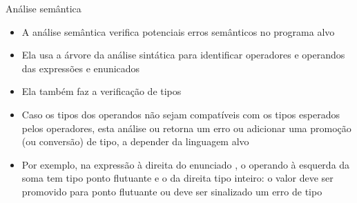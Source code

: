 \begin{frame}[fragile]{Análise semântica}

    \begin{itemize}
        \item A análise semântica verifica potenciais erros semânticos no programa alvo
        \pause

        \item Ela usa a árvore da análise sintática para identificar operadores e operandos das expressões e enunicados
        \pause

        \item Ela também faz a verificação de tipos
        \pause

        \item Caso os tipos dos operandos não sejam compatíveis com os tipos esperados pelos operadores, esta análise ou retorna um erro ou adicionar uma
        promoção (ou conversão) de tipo, a depender da linguagem alvo
        \pause

        \item Por exemplo, na expressão à direita do enunciado , o operando à esquerda da soma tem tipo ponto flutuante e o da direita
            tipo inteiro: o valor  deve ser promovido para ponto flutuante ou deve ser sinalizado um erro de tipo
    \end{itemize}

\end{frame}

